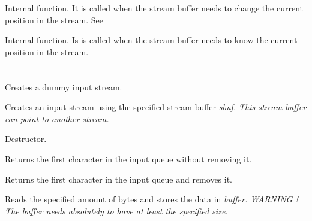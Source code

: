 Internal function. It is called when the stream buffer needs to change the
current position in the stream. See 


Internal function. Is is called when the stream buffer needs to know the
current position in the stream.


\section{}\label{wxinputstream}







Creates a dummy input stream.


Creates an input stream using the specified stream buffer \it{sbuf}. This
stream buffer can point to another stream.


Destructor.



Returns the first character in the input queue without removing it.


Returns the first character in the input queue and removes it.


Reads the specified amount of bytes and stores the data in \it{buffer}.
\it{WARNING !} The buffer needs absolutely to have at least the specified size.

